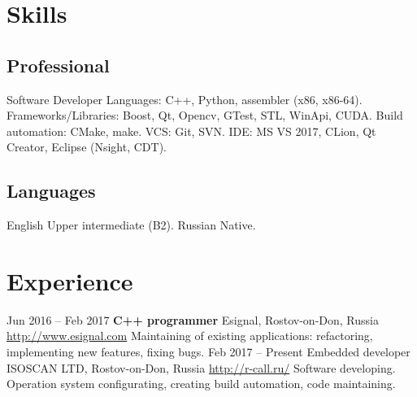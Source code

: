 \documentclass[11pt,a4paper]{moderncv}
\newcommand{\EngRus}[2]{#1}
\newcommand{\BirthPlaceOfValour}{\EngRus{Rostov-on-Don, Russia}{Ростов-на-Дону, Россия}}
\begin{document}
\maketitle

\section{\EngRus{Skills}{Навыки}}
  \subsection{\EngRus{Professional}{Профессиональные}}
    \cvline
    {\EngRus{Software Developer}{Разработчик программного обеспечения}}
      {
      \EngRus{Languages}{Языки}: C++, Python, assembler (x86, x86-64).\newline{}
      \EngRus{Frameworks/Libraries}{Фреймворки/Библиотеки}: Boost, Qt, Opencv, GTest, STL, WinApi, CUDA.\newline{}
      \EngRus{Build automation}{Системы автоматизации сборки}: CMake, make.\newline{}
      \EngRus{VCS}{Системы управления версиями}: Git, SVN.\newline{}
      IDE: MS VS 2017, CLion, Qt Creator, Eclipse (Nsight, CDT).
      }
  \subsection{\EngRus{Languages}{Языки}}
    \cvline
    {\EngRus{English}{Английский}}
      {
      \EngRus{Upper intermediate}{Разговорный} (B2).
      }
    \cvline
    {\EngRus{Russian}{Русский}}
      {
      \EngRus{Native}{Носитель}.
      }
    

\section{\EngRus{Experience}{Опыт}}
\cventry
  {\EngRus{Jun}{Июнь} 2016 -- \EngRus{Feb}{Февраль} 2017}
  {\bfseries \EngRus{C++ programmer}{C++ программист}}
  {Esignal, \BirthPlaceOfValour}
  {\newline{}\url{http://www.esignal.com}}{}
  {\EngRus{Maintaining of existing applications: refactoring, implementing new features, fixing bugs.}{Поддержка текущего кода: рефакторинг, исправление багов и добавление новых возможностей.}}
\cventry
  {\EngRus{Feb}{Февраль} 2017 -- \EngRus{Present}{н.в}}
  {\EngRus{Embedded developer}{Разработчик встраиваемого ПО}}
  {\EngRus{ISOSCAN LTD}{ООО "Изоскан"}, \BirthPlaceOfValour}
  {\newline{}\url{http://r-call.ru/}}{}
  {\EngRus{Software developing. Operation system configurating, creating build automation, code maintaining.}{Разработка программного обеспечения. Настройка операционных систем, систем сборки, поддержка текущего кода.}}
\end{document}
